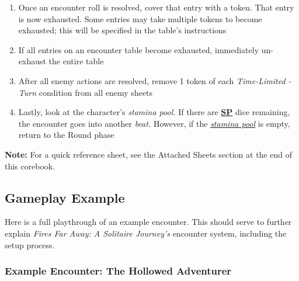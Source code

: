 \documentclass[12pt]{article}
\newcommand{\refto}[1]{\hyperlink{#1}{\textbf{#1}}}
\newcommand{\reftoit}[1]{\hyperlink{#1}{\emph{#1}}}
\begin{document}
\begin{multicols*}{2}
\begin{enumerate}
\item Once an encounter roll is resolved, cover that entry with a token. That entry is now exhausted. Some entries may take multiple tokens to become exhausted; this will be specified in the table’s instructions
\item If all entries on an encounter table become exhausted, immediately un-exhaust the entire table
\item After all enemy actions are resolved, remove 1 token of each \emph{Time-Limited - Turn} condition from all enemy sheets
\item Lastly, look at the character’s \emph{stamina pool.} If there are \refto{SP} dice remaining, the encounter goes into another \emph{beat.} However, if the \reftoit{stamina pool} is empty, return to the Round phase
\end{enumerate}

\begin{tcolorbox}
\textbf{Note:} For a quick reference sheet, see the Attached Sheets section at the end of this corebook.
\end{tcolorbox}

\end{multicols*}

\pagebreak
\subsection{Gameplay Example}
Here is a full playthrough of an example encounter. This should serve to further explain \emph{Fires Far Away: A Solitaire Journey’s} encounter system, including the setup process.
\subsubsection*{Example Encounter: The Hollowed Adventurer}
\begin{center}
\end{center}
\end{document}
